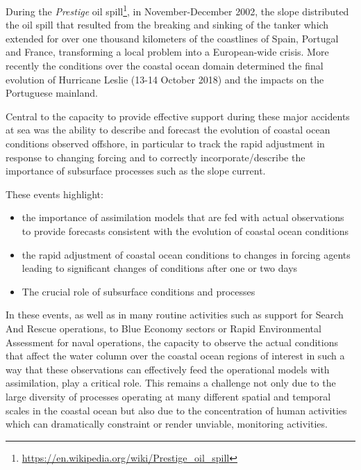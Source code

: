 During the \emph{Prestige} oil
spill\footnote{\url{https://en.wikipedia.org/wiki/Prestige_oil_spill}},
in November-December 2002, the slope %
distributed the oil spill that resulted from the breaking and sinking
of the tanker which extended for over one thousand kilometers of the
coastlines of Spain, Portugal and France, transforming a local problem
into a European-wide crisis. More recently the conditions over the
coastal ocean domain determined the final evolution of Hurricane
Leslie (13-14 October 2018) and the impacts on the Portuguese
mainland.
 
Central to the capacity to provide effective support during these
major accidents at sea was the ability to describe and forecast the
evolution of coastal ocean conditions observed offshore, in particular
to track the rapid adjustment in response to changing forcing and to
correctly incorporate/describe the importance of subsurface processes
such as the slope current.
 
These events highlight:

\begin{itemize}[noitemsep,topsep=0pt,parsep=0pt,partopsep=0pt]
  
\item the importance of assimilation models that are fed with actual
  observations to provide forecasts consistent with the evolution of
  coastal ocean conditions

\item the rapid adjustment of coastal ocean conditions to changes in
  forcing agents leading to significant changes of conditions after
  one or two days

\item The crucial role of subsurface conditions and processes
 
\end{itemize}

In these events, as well as in many routine activities such as support
for Search And Rescue operations, to Blue Economy sectors or Rapid
Environmental Assessment for naval operations, the capacity to observe
the actual conditions that affect the water column over the coastal
ocean regions of interest in such a way that these observations can
effectively feed the operational models with assimilation, play a
critical role. This remains a challenge not only due to the large
diversity of processes operating at many different spatial and
temporal scales in the coastal ocean but also due to the concentration
of human activities which can dramatically constraint or render
unviable, monitoring activities.


